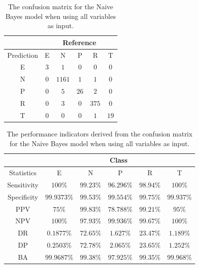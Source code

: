 \documentclass[preprint,12pt]{elsarticle}
\begin{document}
\begin{table}[!ht]
	\centering
	\begin{tabular}{|c|c|c|c|c|c|}
		\hline
		 & \multicolumn{5}{|c|}{Reference} \\ \hline
		 Prediction & E & N & P & R & T \\ \hline
		 E & $3$ & $1$ & $0$ & $0$ & $0$ \\ \hline
		 N & $0$ & $1161$ & $1$ & $1$ & $0$ \\ \hline
		 P & $0$ & $5$ & $26$ & $2$ & $0$ \\ \hline
		 R & $0$ & $3$ & $0$ & $375$ & $0$ \\ \hline
		 T & $0$ & $0$ & $0$ & $1$ & $19$ \\ \hline
	\end{tabular}
	\caption{The confusion matrix for the Naive Bayes model when using all variables as input.}
	\label{tab:cm:all:nb}
\end{table}

\begin{table}[!ht]
	\centering
	\begin{tabular}{|c|c|c|c|c|c|}
		\hline
		 & \multicolumn{5}{c|}{Class} \\ \hline
		Statistics & E & N & P & R & T \\ \hline
		Sensitivity & $100\%$ & $99.23\%$ & $96.296\%$ & $98.94\%$ & $100\%$ \\ \hline
		Specificity & $99.9373\%$ & $99.53\%$ & $99.554\%$ & $99.75\%$ & $99.937\%$ \\ \hline
		PPV & $75\%$ & $99.83\%$ & $78.788\%$ & $99.21\%$ & $95\%$ \\ \hline
		NPV & $100\%$ & $97.93\%$ & $99.936\%$ & $99.67\%$ & $100\%$ \\ \hline
		DR & $0.1877\%$ & $72.65\%$ & $1.627\%$ & $23.47\%$ & $1.189\%$ \\ \hline
		DP & $0.2503\%$ & $72.78\%$ & $2.065\%$ & $23.65\%$ & $1.252\%$ \\ \hline
		BA & $99.9687\%$ & $99.38\%$ & $97.925\%$ & $99.35\%$ & $99.968\%$ \\ \hline
	\end{tabular}
	\caption{The performance indicators derived from the confusion matrix for the Naive Bayes model when using all variables as input.}
	\label{tab:cs:reverse:all:nb}
\end{table}
\end{document}
